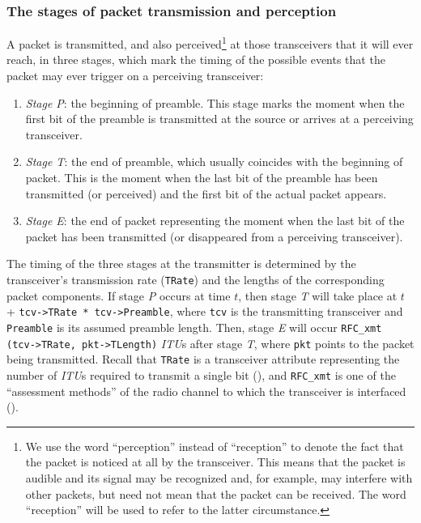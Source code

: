 \subsubsection{The stages of packet transmission and perception}
\label{rm_tr_ra_ps}

A packet is transmitted, and also perceived\footnote{We use the word
``perception'' instead of ``reception'' to denote the fact that the packet
is noticed at all by the transceiver.
This means that the packet is audible and its signal
may be recognized and, for example, may interfere with other packets,
but need not mean that the packet can be received.
The word ``reception'' will be used to refer to the latter circumstance.}
at those transceivers that it will
ever reach, in three stages, which mark the timing of the possible events
that the packet may ever trigger on a perceiving transceiver:
\begin{enumerate}
\item
{\em Stage P\/}: the beginning of preamble.
This stage marks the moment when the first bit of the
preamble is transmitted at the source or arrives at a perceiving
transceiver.
\item
{\em Stage T\/}:
the end of preamble, which usually coincides with the beginning of packet.
This is the moment when the last bit of the preamble has been transmitted (or
perceived) and the first bit of the actual packet appears.
\item
{\em Stage E\/}:
the end of packet representing the moment when the last bit of the
packet has been transmitted (or disappeared from a perceiving transceiver).
\end{enumerate}

\noindent
The timing of the three stages at the transmitter is
determined by the transceiver's transmission rate ({\tt TRate}) and the lengths
of the corresponding packet components.
If stage {\em P\/} occurs at time $t$, then stage {\em T\/} will take place
at $t$ + {\tt tcv->TRate * tcv->Preamble}, where {\tt tcv} is the transmitting
transceiver and {\tt Preamble} is its assumed preamble length.
Then, stage {\em E\/} will occur {\tt RFC\_xmt (tcv->TRate, pkt->TLength)}
{\em ITU\/}s after stage {\em T}, where
{\tt pkt} points to the packet being transmitted.
Recall that {\tt TRate} is a transceiver attribute representing the number of
{\em ITU\/}s required to transmit a single bit (), and
{\tt RFC\_xmt} is one of the ``assessment methods'' of the radio channel to
which the transceiver is interfaced ().

